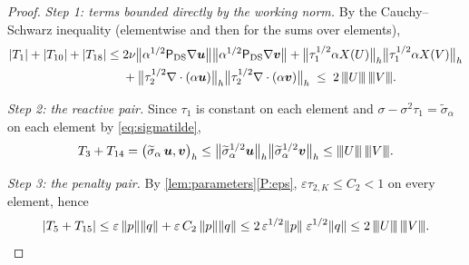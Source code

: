 \documentclass[11pt,a4paper]{article}
\newcommand{\bu}{\boldsymbol{u}}
\newcommand{\bv}{\boldsymbol{v}}
\newcommand{\ViscProj}{\mathsf{P}_{\mathrm{DS}}}
\newcommand{\X}{X}
\DeclarePairedDelimiter{\norm}{\lVert}{\rVert}
\newcommand{\triplenorm}[1]{{\lvert\kern-0.25ex\lvert\kern-0.25ex\lvert #1
\rvert\kern-0.25ex\rvert\kern-0.25ex\rvert}}
\newcommand{\sigmatilde}{\widetilde{\sigma}_{\alpha}}
\theoremstyle{plain}
\theoremstyle{remark}
\theoremstyle{definition}
\numberwithin{equation}{section}
\begin{document}
\begin{proof}
\medskip\noindent\emph{Step 1: terms bounded directly by the working norm.}
By the Cauchy--Schwarz inequality (elementwise and then for the sums over elements),
\begin{align}
  |T_1| + |T_{10}| + |T_{18}|
  \le{}& 2\nu\bigl\lVert\alpha^{1/2}\ViscProj\nabla\bu\bigr\rVert
        \bigl\lVert\alpha^{1/2}\ViscProj\nabla\bv\bigr\rVert
  + \bigl\lVert\tau_1^{1/2}\alpha\X(U)\bigr\rVert_h
        \bigl\lVert\tau_1^{1/2}\alpha\X(V)\bigr\rVert_h \nonumber\\
  &+ \bigl\lVert\tau_2^{1/2}\nabla\cdot(\alpha\bu)\bigr\rVert_h
        \bigl\lVert\tau_2^{1/2}\nabla\cdot(\alpha\bv)\bigr\rVert_h
  \;\le\; 2\,\triplenorm{U}\,\triplenorm{V}.
  \label{eq:easystep}
\end{align}

\medskip\noindent\emph{Step 2: the reactive pair.}
Since $\tau_1$ is constant on each element and
$\sigma-\sigma^2\tau_{1}=\sigmatilde$ on each element by \eqref{eq:sigmatilde},
\begin{equation}\label{eq:reactivestep}
  T_3 + T_{14} = \bigl(\sigmatilde\,\bu,\bv\bigr)_h
  \le \bigl\lVert\sigmatilde^{1/2}\bu\bigr\rVert_h
      \bigl\lVert\sigmatilde^{1/2}\bv\bigr\rVert_h
  \le \triplenorm{U}\,\triplenorm{V}.
\end{equation}

\medskip\noindent\emph{Step 3: the penalty pair.}
By \cref{lem:parameters}\ref{P:eps}, $\varepsilon\tau_{2,K}\le C_2<1$ on every element,
hence
\begin{equation}\label{eq:penaltystep}
  |T_5 + T_{15}|
  \le \varepsilon\,\norm{p}\norm{q} + \varepsilon\,C_2\,\norm{p}\norm{q}
  \le 2\,\varepsilon^{1/2}\norm{p}\;\varepsilon^{1/2}\norm{q}
  \le 2\,\triplenorm{U}\,\triplenorm{V}.
\end{equation}


\end{proof}
\end{document}
